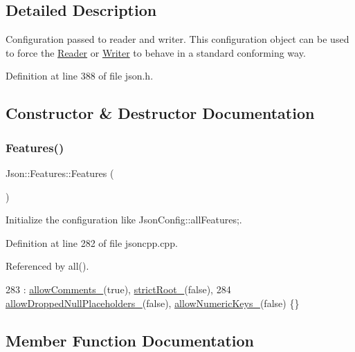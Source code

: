 \subsection{Detailed Description}
Configuration passed to reader and writer. This configuration object can be used to force the \hyperlink{class_json_1_1_reader}{Reader} or \hyperlink{class_json_1_1_writer}{Writer} to behave in a standard conforming way. 

Definition at line 388 of file json.\+h.



\subsection{Constructor \& Destructor Documentation}
\mbox{\label{class_json_1_1_features_ad15a091cb61bb31323299a95970d2644}} 
\subsubsection{\texorpdfstring{Features()}{Features()}}
{\footnotesize\ttfamily Json\+::\+Features\+::\+Features (\begin{DoxyParamCaption}{ }\end{DoxyParamCaption})}



Initialize the configuration like Json\+Config\+::all\+Features;. 



Definition at line 282 of file jsoncpp.\+cpp.



Referenced by all().


\begin{DoxyCode}
283     : \hyperlink{class_json_1_1_features_a33afd389719624b6bdb23950b3c346c9}{allowComments\_}(\textcolor{keyword}{true}), \hyperlink{class_json_1_1_features_a1162c37a1458adc32582b585b552f9c3}{strictRoot\_}(\textcolor{keyword}{false}),
284       \hyperlink{class_json_1_1_features_a5076aa72c05c7596ac339ede36c97a6a}{allowDroppedNullPlaceholders\_}(\textcolor{keyword}{false}), 
      \hyperlink{class_json_1_1_features_aff3cb16b79d15d3d761b11a0dd6d4d6b}{allowNumericKeys\_}(\textcolor{keyword}{false}) \{\}
\end{DoxyCode}


\subsection{Member Function Documentation}
\mbox{\label{class_json_1_1_features_a63894da6e2c100b38741fa933f3d33ae}} 
